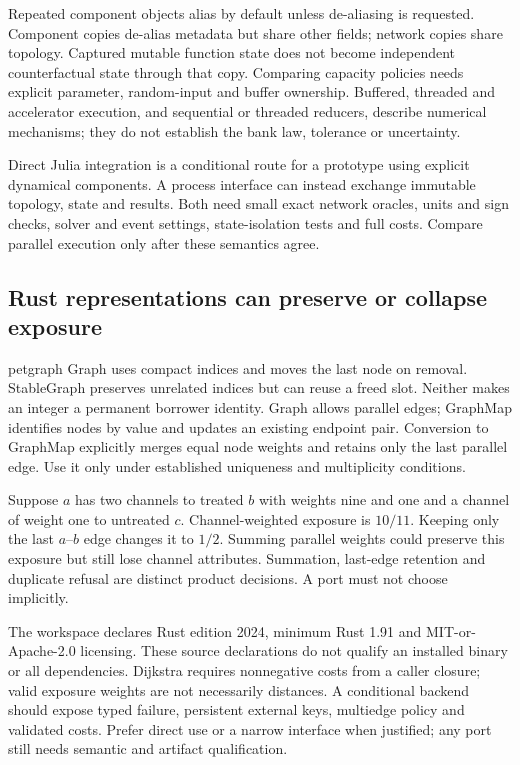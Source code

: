 Repeated component objects alias by default unless de-aliasing is requested.
Component copies de-alias metadata but share other fields; network copies
share topology. Captured mutable function state does not become independent
counterfactual state through that copy. Comparing capacity policies needs
explicit parameter, random-input and buffer ownership. Buffered, threaded and
accelerator execution, and sequential or threaded reducers, describe numerical
mechanisms; they do not establish the bank law, tolerance or uncertainty.
\citep{exec25_onet_dynamics,exec25_onet_choice}

Direct Julia integration is a conditional route for a prototype using explicit
dynamical components. A process interface can instead exchange immutable
topology, state and results. Both need small exact network oracles, units and
sign checks, solver and event settings, state-isolation tests and full costs.
Compare parallel execution only after these semantics agree.
\citep{exec25_onet_choice}

\subsection{Rust representations can preserve or collapse exposure}

petgraph Graph uses compact indices and moves the last node on removal.
StableGraph preserves unrelated indices but can reuse a freed slot. Neither
makes an integer a permanent borrower identity. Graph allows parallel edges;
GraphMap identifies nodes by value and updates an existing endpoint pair.
Conversion to GraphMap explicitly merges equal node weights and retains only
the last parallel edge. Use it only under established uniqueness and
multiplicity conditions.\citep{exec25_onet_petgraph}

Suppose $a$ has two channels to treated $b$ with weights nine and one and a
channel of weight one to untreated $c$. Channel-weighted exposure is $10/11$.
Keeping only the last $a$--$b$ edge changes it to $1/2$. Summing parallel
weights could preserve this exposure but still lose channel attributes.
Summation, last-edge retention and duplicate refusal are distinct product
decisions. A port must not choose implicitly.
\citep{exec25_onet_petgraph,exec25_onet_choice}

The workspace declares Rust edition 2024, minimum Rust 1.91 and
MIT-or-Apache-2.0 licensing. These source declarations do not qualify an
installed binary or all dependencies. Dijkstra requires nonnegative costs
from a caller closure; valid exposure weights are not necessarily distances.
A conditional backend should expose typed failure, persistent external keys,
multiedge policy and validated costs. Prefer direct use or a narrow interface
when justified; any port still needs semantic and artifact qualification.
\citep{exec25_onet_petgraph,exec25_onet_choice}


